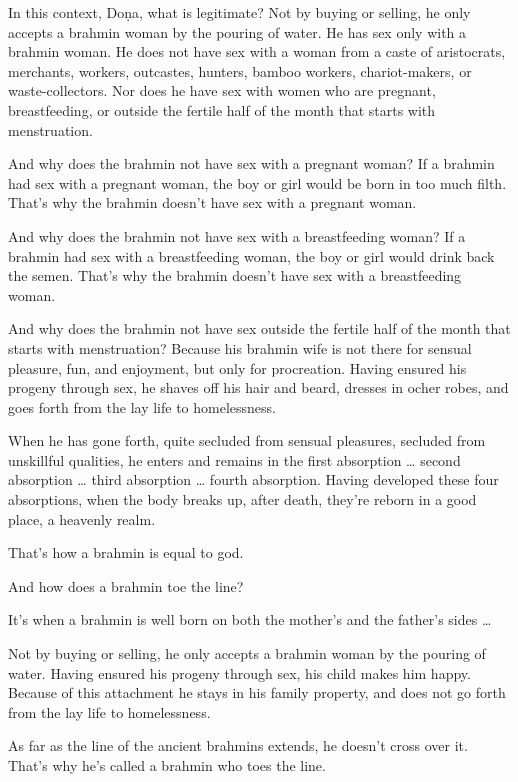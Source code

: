 \documentclass[12pt,openany]{book}%
\begin{document}
In this context, \textsanskrit{Doṇa}, what is legitimate? Not by buying or selling, he only accepts a brahmin woman by the pouring of water. He has sex only with a brahmin woman. He does not have sex with a woman from a caste of aristocrats, merchants, workers, outcastes, hunters, bamboo workers, chariot-makers, or waste-collectors. Nor does he have sex with women who are pregnant, breastfeeding, or outside the fertile half of the month that starts with menstruation. 

And why does the brahmin not have sex with a pregnant woman? If a brahmin had sex with a pregnant woman, the boy or girl would be born in too much filth. That’s why the brahmin doesn’t have sex with a pregnant woman. 

And why does the brahmin not have sex with a breastfeeding woman? If a brahmin had sex with a breastfeeding woman, the boy or girl would drink back the semen. That’s why the brahmin doesn’t have sex with a breastfeeding woman. 

And why does the brahmin not have sex outside the fertile half of the month that starts with menstruation? Because his brahmin wife is not there for sensual pleasure, fun, and enjoyment, but only for procreation. Having ensured his progeny through sex, he shaves off his hair and beard, dresses in ocher robes, and goes forth from the lay life to homelessness. 

When he has gone forth, quite secluded from sensual pleasures, secluded from unskillful qualities, he enters and remains in the first absorption … second absorption … third absorption … fourth absorption. Having developed these four absorptions, when the body breaks up, after death, they’re reborn in a good place, a heavenly realm. 

That’s how a brahmin is equal to god. 

And how does a brahmin toe the line? 

It’s when a brahmin is well born on both the mother’s and the father’s sides … 

Not by buying or selling, he only accepts a brahmin woman by the pouring of water. Having ensured his progeny through sex, his child makes him happy. Because of this attachment he stays in his family property, and does not go forth from the lay life to homelessness. 

As far as the line of the ancient brahmins extends, he doesn’t cross over it. That’s why he’s called a brahmin who toes the line. 
\end{document}
